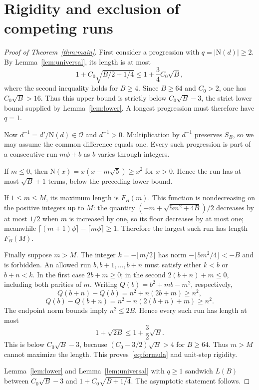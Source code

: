 \documentclass[11pt]{article}
\newcommand{\N}{\mathrm N}
\begin{document}
\section{Rigidity and exclusion of competing runs}
\begin{proof}[Proof of Theorem~\ref{thm:main}]
First consider a progression with $q=|\N(d)|\ge2$. By Lemma~\ref{lem:universal}, its length is at most
\[
 1+C_0\sqrt{B/2+1/4}\le1+\frac34C_0\sqrt B,
\]
where the second inequality holds for $B\ge4$. Since $B\ge64$ and $C_0>2$, one has $C_0\sqrt B>16$. Thus this upper bound is strictly below $C_0\sqrt B-3$, the strict lower bound supplied by Lemma~\ref{lem:lower}. A longest progression must therefore have $q=1$.

Now $d^{-1}=d'/\N(d)\in\mathcal O$ and $d^{-1}>0$. Multiplication by $d^{-1}$ preserves $S_B$, so we may assume the common difference equals one. Every such progression is part of a consecutive run $m\phi+b$ as $b$ varies through integers.

If $m\le0$, then $\N(x)=x(x-m\sqrt5)\ge x^2$ for $x>0$. Hence the run has at most $\sqrt B+1$ terms, below the preceding lower bound.

If $1\le m\le M$, its maximum length is $F_B(m)$. This function is nondecreasing on the positive integers up to $M$: the quantity $(-m+\sqrt{5m^2+4B})/2$ decreases by at most $1/2$ when $m$ is increased by one, so its floor decreases by at most one; meanwhile $\lceil(m+1)\phi\rceil-\lceil m\phi\rceil\ge1$. Therefore the largest such run has length $F_B(M)$.

Finally suppose $m>M$. The integer $k=-\lfloor m/2\rfloor$ has norm $-\lfloor5m^2/4\rfloor<-B$ and is forbidden. An allowed run $b,b+1,\ldots,b+n$ must satisfy either $k<b$ or $b+n<k$. In the first case $2b+m\ge0$; in the second $2(b+n)+m\le0$, including both parities of $m$. Writing $Q(b)=b^2+mb-m^2$, respectively,
\[
 Q(b+n)-Q(b)=n^2+n(2b+m)\ge n^2,
\]
\[
 Q(b)-Q(b+n)=n^2-n(2(b+n)+m)\ge n^2.
\]
The endpoint norm bounds imply $n^2\le2B$. Hence every such run has length at most
\[
 1+\sqrt{2B}\le1+\frac32\sqrt B.
\]
This is below $C_0\sqrt B-3$, because $(C_0-3/2)\sqrt B>4$ for $B\ge64$. Thus $m>M$ cannot maximize the length. This proves~\eqref{eq:formula} and unit-step rigidity.

Lemma~\ref{lem:lower} and Lemma~\ref{lem:universal} with $q\ge1$ sandwich $L(B)$ between $C_0\sqrt B-3$ and $1+C_0\sqrt{B+1/4}$. The asymptotic statement follows.
\end{proof}
\end{document}
